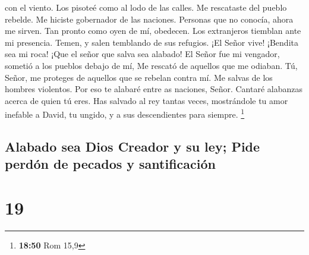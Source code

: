 con el viento. Los pisoteé como al lodo de las calles.  Me
rescataste del pueblo rebelde. Me hiciste gobernador de las naciones.
Personas que no conocía, ahora me sirven.  Tan pronto como
oyen de mí, obedecen. Los extranjeros tiemblan ante mi presencia.
 Temen, y salen temblando de sus refugios. 
¡El Señor vive! ¡Bendita sea mi roca! ¡Que el señor que salva sea
alabado!  El Señor fue mi vengador, sometió a los pueblos
debajo de mí,  Me rescató de aquellos que me odiaban. Tú,
Señor, me proteges de aquellos que se rebelan contra mí. Me salvas de
los hombres violentos.  Por eso te alabaré entre as
naciones, Señor. Cantaré alabanzas acerca de quien tú eres.
 Has salvado al rey tantas veces, mostrándole tu amor
inefable a David, tu ungido, y a sus descendientes para siempre.
\footnote{\textbf{18:50} Rom 15,9}

\hypertarget{alabado-sea-dios-creador-y-su-ley-pide-perduxf3n-de-pecados-y-santificaciuxf3n}{%
\subsection{Alabado sea Dios Creador y su ley; Pide perdón de pecados y
santificación}\label{alabado-sea-dios-creador-y-su-ley-pide-perduxf3n-de-pecados-y-santificaciuxf3n}}

\hypertarget{section-18}{%
\section{19}\label{section-18}}

